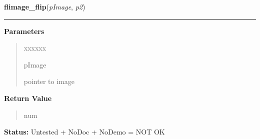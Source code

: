 \hspace{.8\funcindent}\begin{boxedminipage}{\funcwidth}

    \raggedright \textbf{flimage\_flip}(\textit{pImage}, \textit{p2})

    \vspace{-1.5ex}

    \rule{\textwidth}{0.5\fboxrule}
\setlength{\parskip}{2ex}
\setlength{\parskip}{1ex}
      \textbf{Parameters}
      \vspace{-1ex}

      \begin{quote}
        \begin{Ventry}{xxxxxx}

          \item[pImage]

          pointer to image

        \end{Ventry}

      \end{quote}

      \textbf{Return Value}
    \vspace{-1ex}

      \begin{quote}
      num

      \end{quote}

\textbf{Status:} Untested + NoDoc + NoDemo = NOT OK



    \end{boxedminipage}

    \label{xformslib:flflimage:flimage_scale}

    \vspace{0.5ex}

